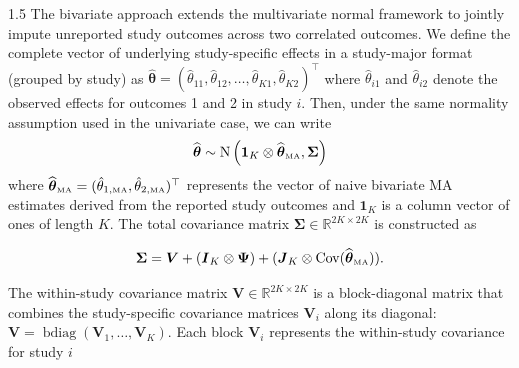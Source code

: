 \documentclass{article}
\begin{document}
\begin{spacing}{1.5}
The bivariate approach extends the multivariate normal framework to jointly impute unreported study outcomes across two correlated outcomes. We define the complete vector of underlying study-specific effects in a study-major format (grouped by study) as $\widehat{\boldsymbol{\theta}} = (\hat{\theta}_{11}, \hat{\theta}_{12}, \dots, \hat{\theta}_{K1}, \hat{\theta}_{K2})^\top$ where $\hat{\theta}_{i1}$ and $\hat{\theta}_{i2}$ denote the observed effects for outcomes 1 and 2 in study $i$. Then, under the same normality assumption used in the univariate case, we can write
\begin{equation*}
    \widehat{\boldsymbol{\theta}} 
\sim \operatorname{N}\left( \boldsymbol{1}_K \otimes \widehat{\boldsymbol{\theta}}_{\tiny{\mbox{MA}}}, \boldsymbol{\Sigma} \right)
\end{equation*}
where $\widehat{\boldsymbol{\theta}}_{\tiny{\mbox{MA}}} = (\hat{\theta}_{1,\tiny{\mbox{MA}}}, \hat{\theta}_{2,\tiny{\mbox{MA}}})^\top$ represents the vector of naive bivariate MA estimates derived from the reported study outcomes and $\boldsymbol{1}_K$ is a column vector of ones of length $K$.
The total covariance matrix $\boldsymbol{\Sigma} \in \mathbb{R}^{2K \times 2K}$ is constructed as

\begin{equation*} 
\label{eq:sigma_multi_rem} \boldsymbol{\Sigma} = \boldsymbol{V} + (\boldsymbol{I}_K \otimes \boldsymbol{\Psi}) + (\boldsymbol{J}_K \otimes \operatorname{Cov}(\widehat{\boldsymbol{\theta}}_{\tiny{\mbox{MA}}})). 
\end{equation*}

The within-study covariance matrix $\boldsymbol{V} \in \mathbb{R}^{2K \times 2K}$ is a block-diagonal matrix that combines the study-specific covariance matrices $\boldsymbol{V}_i$ along its diagonal: $\boldsymbol{V} = \operatorname{bdiag}(\boldsymbol{V}_1, \dots, \boldsymbol{V}_K)$. Each block $\boldsymbol{V}_i$ represents the within-study covariance for study $i$


\end{spacing}
\end{document}
